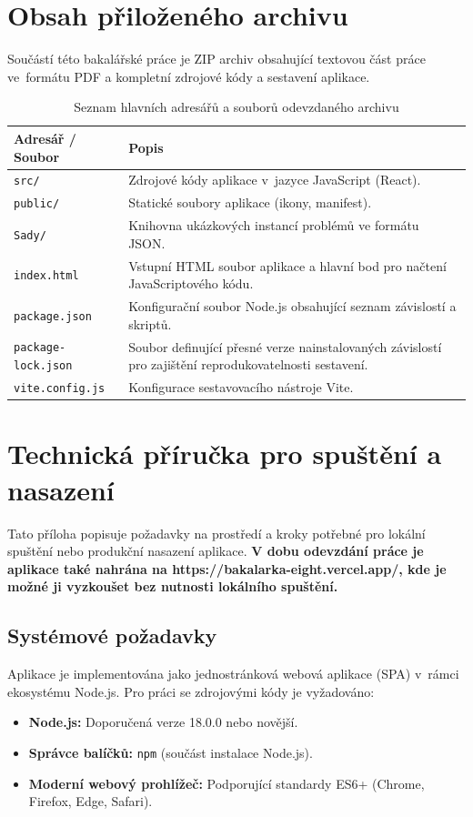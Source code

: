 \chapter{Obsah přiloženého archivu}
\label{chap:AppendixA}

Součástí této bakalářské práce je ZIP archiv obsahující textovou část práce ve~formátu PDF a kompletní zdrojové kódy a sestavení aplikace.

\begin{table}[htbp]
    \centering
    \begin{tabular}{|l|p{10cm}|}
        \hline
        \textbf{Adresář / Soubor} & \textbf{Popis} \\ \hline
        \texttt{src/} & Zdrojové kódy aplikace v~jazyce JavaScript (React). \\ \hline
        \texttt{public/} & Statické soubory aplikace (ikony, manifest). \\ \hline
        \texttt{Sady/} & Knihovna ukázkových instancí problémů ve formátu JSON. \\ \hline
        \texttt{index.html} & Vstupní HTML soubor aplikace a hlavní bod pro načtení JavaScriptového kódu. \\ \hline
        \texttt{package.json} & Konfigurační soubor Node.js obsahující seznam závislostí a skriptů. \\ \hline
        \texttt{package-lock.json} & Soubor definující přesné verze nainstalovaných závislostí pro zajištění reprodukovatelnosti sestavení. \\ \hline
        \texttt{vite.config.js} & Konfigurace sestavovacího nástroje Vite. \\ \hline
    \end{tabular}
    \caption{Seznam hlavních adresářů a souborů odevzdaného archivu}
    \label{tab:zip-contents}
\end{table}

\chapter{Technická příručka pro spuštění a nasazení}
\label{chap:AppendixB}

Tato příloha popisuje požadavky na prostředí a kroky potřebné pro lokální spuštění nebo produkční nasazení aplikace. \textbf{V dobu odevzdání práce je aplikace také nahrána na https://bakalarka-eight.vercel.app/, kde je možné ji vyzkoušet bez nutnosti lokálního spuštění.}

\section{Systémové požadavky}
Aplikace je implementována jako jednostránková webová aplikace (SPA) v~rámci ekosystému Node.js. Pro práci se zdrojovými kódy je vyžadováno:
\begin{itemize}
    \item \textbf{Node.js:} Doporučená verze 18.0.0 nebo novější.
    \item \textbf{Správce balíčků:} \texttt{npm} (součást instalace Node.js).
    \item \textbf{Moderní webový prohlížeč:} Podporující standardy ES6+ (Chrome, Firefox, Edge, Safari).
\end{itemize}

